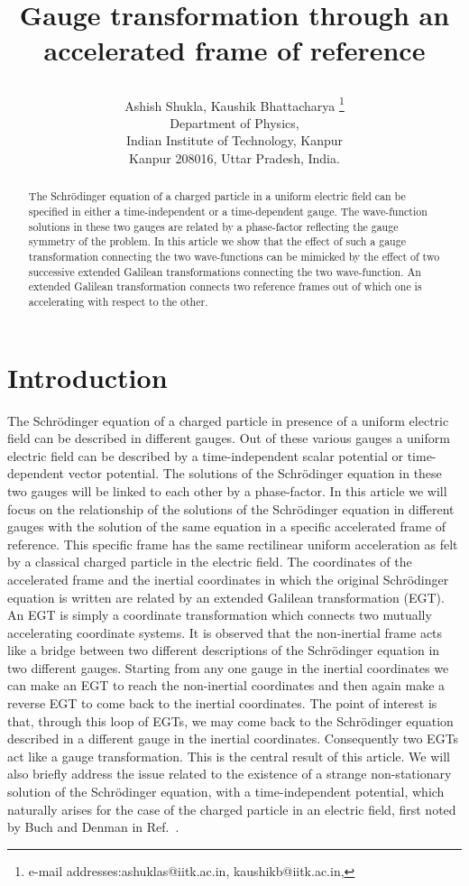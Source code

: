 \documentclass[12pt]{article}
\title{\centerline \bf Gauge transformation through an
  accelerated frame of reference}
\author{Ashish Shukla, Kaushik
  Bhattacharya \thanks{e-mail addresses:ashuklas@iitk.ac.in, 
kaushikb@iitk.ac.in,
  }\\
  \normalsize
  Department of Physics,\\
  \normalsize
  Indian Institute of Technology, Kanpur\\
  \normalsize
  Kanpur 208016, Uttar Pradesh, India.\\
}
\begin{document}
\maketitle
\begin{abstract}
The Schr\"{o}dinger equation of a charged particle in a uniform
electric field can be specified in either a time-independent or a
time-dependent gauge. The wave-function solutions in these two gauges
are related by a phase-factor reflecting the gauge symmetry of the
problem. In this article we show that the effect of such a gauge
transformation connecting the two wave-functions can be mimicked by
the effect of two successive extended Galilean transformations
connecting the two wave-function. An extended Galilean transformation
connects two reference frames out of which one is accelerating with
respect to the other.
\end{abstract}
\section{Introduction}
The Schr\"{o}dinger equation of a charged particle in presence of a uniform
electric field can be described in different gauges. Out of these various
gauges a uniform electric field can be described by a time-independent scalar
potential or time-dependent vector potential.  The solutions of the
Schr\"{o}dinger equation in these two gauges will be linked to each other by a
phase-factor. In this article we will focus on the relationship of the
solutions of the Schr\"{o}dinger equation in different gauges with the
solution of the same equation in a specific accelerated frame of reference.
This specific frame has the same rectilinear uniform acceleration as felt by a
classical charged particle in the electric field. The coordinates of the
accelerated frame and the inertial coordinates in which the original
Schr\"{o}dinger equation is written are related by an extended Galilean
transformation (EGT).  An EGT is simply a coordinate transformation which
connects two mutually accelerating coordinate systems. It is observed that the
non-inertial frame acts like a bridge between two different descriptions of
the Schr\"{o}dinger equation in two different gauges. Starting from any one
gauge in the inertial coordinates we can make an EGT to reach the non-inertial
coordinates and then again make a reverse EGT to come back to the inertial
coordinates. The point of interest is that, through this loop of EGTs, we may
come back to the Schr\"{o}dinger equation described in a different gauge in
the inertial coordinates.  Consequently two EGTs act like a gauge
transformation.  This is the central result of this article. We will also
briefly address the issue related to the existence of a strange non-stationary
solution of the Schr\"{o}dinger equation, with a time-independent potential,
which naturally arises for the case of the charged particle in an electric
field, first noted by Buch and Denman in Ref.~\cite{denman}.
\end{document}
